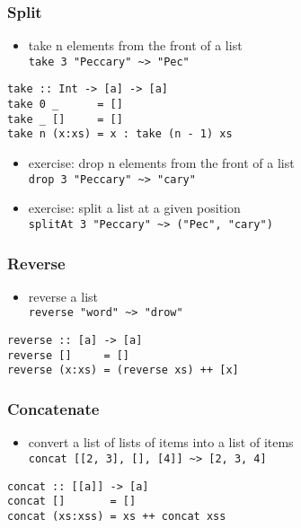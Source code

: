 \documentclass[dvipsnames]{beamer}
\theoremstyle{plain}
\begin{document}
\begin{frame}[fragile]
  \frametitle{Split}

  \begin{itemize}
    \item take n elements from the front of a list\\
      \lstinline[style=exclamfix]|take 3 "Peccary" ~> "Pec"|
  \end{itemize}

  \begin{exampleblock}{}
    \begin{lstlisting}[deletekeywords={take}]
take :: Int -> [a] -> [a]
take 0 _      = []
take _ []     = []
take n (x:xs) = x : take (n - 1) xs
    \end{lstlisting}
  \end{exampleblock}

  \pause
  \begin{itemize}
    \item exercise: drop n elements from the front of a list\\
      \lstinline[style=exclamfix]|drop 3 "Peccary" ~> "cary"|

    \item exercise: split a list at a given position\\
      \lstinline[style=exclamfix]|splitAt 3 "Peccary" ~> ("Pec", "cary")|
  \end{itemize}
\end{frame}

\begin{frame}[fragile]
  \frametitle{Reverse}

  \begin{itemize}
    \item reverse a list\\
      \lstinline[style=exclamfix]|reverse "word" ~> "drow"|
  \end{itemize}

  \begin{exampleblock}{}
    \begin{lstlisting}[deletekeywords={reverse}]
reverse :: [a] -> [a]
reverse []     = []
reverse (x:xs) = (reverse xs) ++ [x]
    \end{lstlisting}
  \end{exampleblock}
\end{frame}

\begin{frame}[fragile]
  \frametitle{Concatenate}

  \begin{itemize}
    \item convert a list of lists of items into a list of items\\
      \lstinline|concat [[2, 3], [], [4]] ~> [2, 3, 4]|
  \end{itemize}

  \begin{exampleblock}{}
    \begin{lstlisting}[deletekeywords={concat}]
concat :: [[a]] -> [a]
concat []       = []
concat (xs:xss) = xs ++ concat xss
    \end{lstlisting}
  \end{exampleblock}
\end{frame}
\end{document}
